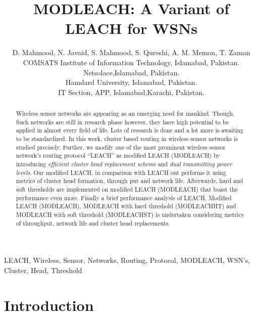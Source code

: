 \documentclass[10pt, conference, compsocconf]{IEEEtran}
\begin{document}
\title{ MODLEACH: A Variant of LEACH for WSNs}

\author{D. Mahmood, N. Javaid, S. Mahmood, S. Qureshi, A. M. Memon, T. Zaman\\
        COMSATS Institute of Information Technology, Islamabad, Pakistan.\\
        Netsolace,Islamabad, Pakistan.\\
        Hamdard University, Islamabad, Pakistan.\\
        IT Section, APP, Islamabad,Karachi, Pakistan.\\
     }

\maketitle
\begin{abstract}

Wireless sensor networks are appearing as an emerging need for mankind. Though, Such networks are still in research phase however, they have high potential to be applied in almost every field of life. Lots of research is done and a lot more is awaiting to be standardized. In this work, cluster based routing in wireless sensor networks is studied precisely. Further, we modify one of the most prominent wireless sensor network's routing protocol ``LEACH'' as modified LEACH (MODLEACH) by introducing \emph{efficient cluster head replacement scheme} and \emph{dual transmitting power levels}. Our modified LEACH, in comparison with LEACH out performs it using metrics of cluster head formation, through put and network life. Afterwards, hard and soft thresholds are implemented on modified LEACH (MODLEACH) that boast the performance even more. Finally a brief performance analysis of LEACH, Modified LEACH (MODLEACH), MODLEACH with hard threshold (MODLEACHHT) and MODLEACH with soft threshold (MODLEACHST) is undertaken considering metrics of throughput, network life and cluster head replacements.
\end{abstract}

\begin{IEEEkeywords}
LEACH, Wireless, Sensor, Networks, Routing, Protocol, MODLEACH, WSN's, Cluster, Head, Threshold
\end{IEEEkeywords}

\section{Introduction}
\end{document}
